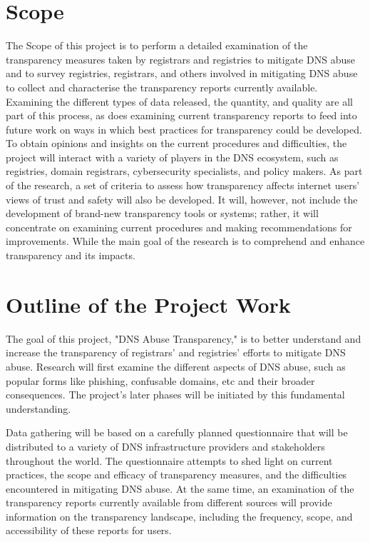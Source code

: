 \section{Scope}	
The Scope of this project is to perform a detailed examination of the transparency measures taken by registrars and registries to mitigate DNS abuse and to survey registries, registrars, and others involved in mitigating DNS abuse to collect and characterise the transparency reports currently available. Examining the different types of data released, the quantity, and quality are all part of this process, as does examining current transparency reports to feed into future work on ways in which best practices for transparency could be developed. To obtain opinions and insights on the current procedures and difficulties, the project will interact with a variety of players in the DNS ecosystem, such as registries, domain registrars, cybersecurity specialists, and policy makers. As part of the research, a set of criteria to assess how transparency affects internet users' views of trust and safety will also be developed. It will, however, not include the development of brand-new transparency tools or systems; rather, it will concentrate on examining current procedures and making recommendations for improvements. While the main goal of the research is to comprehend and enhance transparency and its impacts. 

\section{ Outline of the Project Work} 
The goal of this project, "DNS Abuse Transparency," is to better understand and increase the transparency of registrars' and registries' efforts to mitigate DNS abuse. Research will first examine the different aspects of DNS abuse, such as popular forms like phishing, confusable domains, etc and their broader consequences. The project's later phases will be initiated by this fundamental understanding.

Data gathering will be based on a carefully planned questionnaire that will be distributed to a variety of DNS infrastructure providers and stakeholders throughout the world. The questionnaire attempts to shed light on current practices, the scope and efficacy of transparency measures, and the difficulties encountered in mitigating DNS abuse. At the same time, an examination of the transparency reports currently available from different sources will provide information on the transparency landscape, including the frequency, scope, and accessibility of these reports for users.

